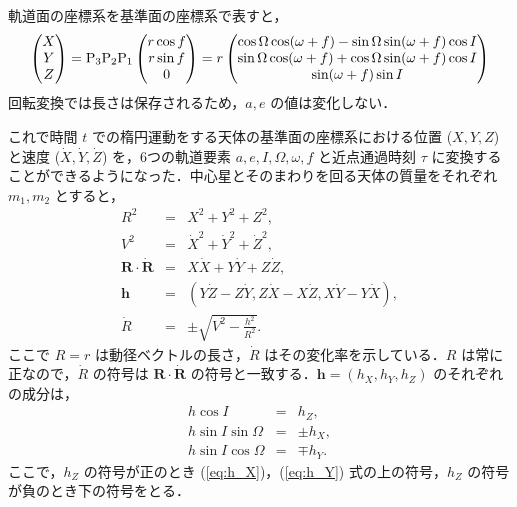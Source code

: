 \documentclass[11pt,a4paper,oneside,onecolumn]{jreport}
\begin{document}
軌道面の座標系を基準面の座標系で表すと，
\begin{equation}
\begin{pmatrix}
X\\
Y\\
Z\\
\end{pmatrix}
= {\rm{\bm P}}_3 {\rm{\bm P}}_2 {\rm{\bm P}}_1
\begin{pmatrix}
r \cos f\\
r \sin f\\
0\\
\end{pmatrix}
= r 
\begin{pmatrix}
\cos \Omega \cos (\omega + f) - \sin \Omega \sin (\omega + f) \cos I\\
\sin \Omega \cos (\omega + f) + \cos \Omega \sin (\omega + f) \cos I\\
\sin (\omega + f) \sin I\\
\end{pmatrix}
\label{eq:xyzXYZ}
\end{equation}
回転変換では長さは保存されるため，$a, e$ の値は変化しない．

これで時間 $t$ での楕円運動をする天体の基準面の座標系における位置 ($X, Y, Z$) と速度 ($\dot{X}, \dot{Y}, \dot{Z}$) を，6つの軌道要素 $a, e, I, \Omega, \omega, f$ と近点通過時刻 $\tau$ に変換することができるようになった．中心星とそのまわりを回る天体の質量をそれぞれ $m_1, m_2$ とすると，
\begin{eqnarray}
R^2 & = & X^2 + Y^2 + Z^2, \label{eq:R}\\
V^2 & = & \dot{X}^2 + \dot{Y}^2 + \dot{Z}^2, \label{eq:Rdot}\\
{\bm R} \cdot \dot{{\bm R}} & = & X \dot{X} + Y \dot{Y} + Z \dot{Z}, \\
{\bm h} & = & (Y \dot{Z} - Z \dot{Y}, Z \dot{X} - X \dot{Z}, X \dot{Y} - Y \dot{X}), \\
\dot{R} & = & \pm \sqrt{V^2 - \frac{h^2}{R^2}}.
\end{eqnarray}
ここで $R = r$ は動径ベクトルの長さ，$\dot{R}$ はその変化率を示している．$R$ は常に正なので，$\dot{R}$ の符号は ${\bm R} \cdot \dot{{\bm R}}$ の符号と一致する．${\bm h} = (h_X, h_Y, h_Z)$ のそれぞれの成分は，
\begin{eqnarray}
h \cos I & = & h_Z, \label{eq:h_Z}\\
h \sin I \sin \Omega & = & \pm h_X, \label{eq:h_X}\\
h \sin I \cos \Omega & = & \mp h_Y. \label{eq:h_Y}
\end{eqnarray}
ここで，$h_Z$ の符号が正のとき (\ref{eq:h_X})，(\ref{eq:h_Y}) 式の上の符号，$h_Z$ の符号が負のとき下の符号をとる．
\end{document}
